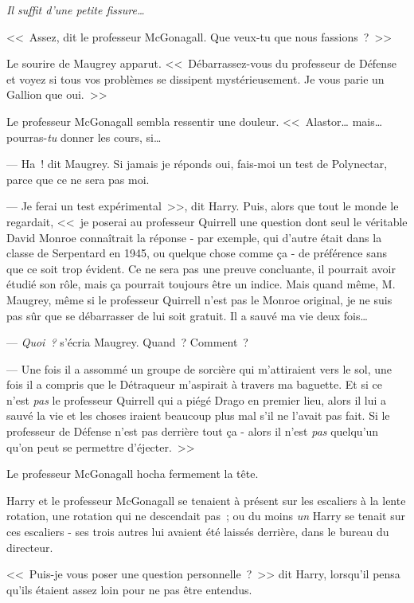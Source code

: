 \emph{Il suffit d'une petite fissure…}

<<~Assez, dit le professeur McGonagall. Que veux-tu que nous fassions~?~>>

Le sourire de Maugrey apparut. <<~Débarrassez-vous du professeur de Défense et voyez si tous vos problèmes se dissipent mystérieusement. Je vous parie un Gallion que oui.~>>

Le professeur McGonagall sembla ressentir une douleur.
<<~Alastor… mais… pourras-\emph{tu} donner les cours, si…

--- Ha~! dit Maugrey. Si jamais je réponds oui, fais-moi un test de Polynectar, parce que ce ne sera pas moi.

--- Je ferai un test expérimental~>>, dit Harry. Puis, alors que tout le monde le regardait, <<~je poserai au professeur Quirrell une question dont seul le véritable David Monroe connaîtrait la réponse - par exemple, qui d'autre était dans la classe de Serpentard en 1945, ou quelque chose comme ça - de préférence sans que ce soit trop évident. Ce ne sera pas une preuve concluante, il pourrait avoir étudié son rôle, mais ça pourrait toujours être un indice. Mais quand même, M. Maugrey, même si le professeur Quirrell n'est pas le Monroe original, je ne suis pas sûr que se débarrasser de lui soit gratuit. Il a sauvé ma vie deux fois…

--- \emph{Quoi~?} s'écria Maugrey. Quand~? Comment~?

--- Une fois il a assommé un groupe de sorcière qui m'attiraient vers le sol, une fois il a compris que le Détraqueur m'aspirait à travers ma baguette. Et si ce n'est \emph{pas} le professeur Quirrell qui a piégé Drago en premier lieu, alors il lui a sauvé la vie et les choses iraient beaucoup plus mal s'il ne l'avait pas fait. Si le professeur de Défense n'est pas derrière tout ça - alors il n'est \emph{pas} quelqu'un qu'on peut se permettre d'éjecter.~>>

Le professeur McGonagall hocha fermement la tête.


Harry et le professeur McGonagall se tenaient à présent sur les escaliers à la lente rotation, une rotation qui ne descendait pas~; ou du moins \emph{un} Harry se tenait sur ces escaliers - ses trois autres lui avaient été laissés derrière, dans le bureau du directeur.

<<~Puis-je vous poser une question personnelle~?~>> dit Harry, lorsqu'il pensa qu'ils étaient assez loin pour ne pas être entendus.

